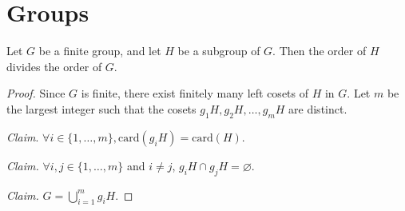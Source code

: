 \section{Groups}
\begin{frame}[allowframebreaks]

  \begin{theorem}
    Let \(G\) be a finite group, and let \(H\) be a subgroup of \(G\). Then the order of \(H\) divides the order of \(G\).
  \end{theorem}
  \begin{proof}
    Since $G$ is finite, there exist finitely many left cosets of $H$ in $G$. Let $m$ be the largest integer such that the cosets $g_1H, g_2H, \ldots, g_mH$ are distinct.

    \textit{Claim}. $\forall i\in \{1,\ldots,m\}, \text{card}(g_iH) = \text{card}(H)$.

    \textit{Claim.} $\forall i,j\in \{1,\ldots,m\}$ and $i\ne j$, $g_iH\cap g_jH = \varnothing$.

    \textit{Claim.} $G = \bigcup_{i=1}^m g_iH$.
  \end{proof}
\end{frame}